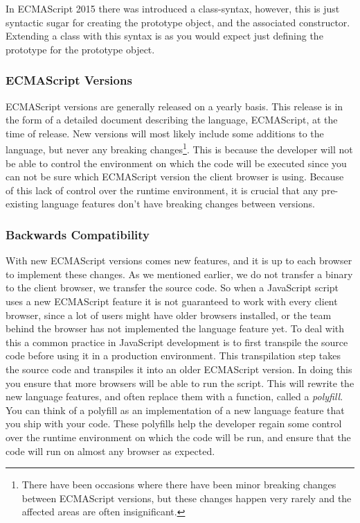 In ECMAScript 2015 there was introduced a class-syntax, however, this is just syntactic sugar for creating the prototype object, and the associated constructor.
Extending a class with this syntax is as you would expect just defining the prototype for the prototype object.

\subsubsection{ECMAScript Versions}\label{subsubsec:ecmascript-versions}

ECMAScript versions are generally released on a yearly basis.
This release is in the form of a detailed document describing the language, ECMAScript, at the time of release.
New versions will most likely include some additions to the language, but never any breaking changes\footnote{There have been occasions where there have been minor breaking changes between ECMAScript versions, but these changes happen very rarely and the affected areas are often insignificant.}.
This is because the developer will not be able to control the environment on which the code will be executed since you can not be sure which ECMAScript version the client browser is using.
Because of this lack of control over the runtime environment, it is crucial that any pre-existing language features don't have breaking changes between versions.

\subsubsection{Backwards Compatibility}\label{subsubsec:backwards-compatability}

With new ECMAScript versions comes new features, and it is up to each browser to implement these changes.
As we mentioned earlier, we do not transfer a binary to the client browser, we transfer the source code.
So when a JavaScript script uses a new ECMAScript feature it is not guaranteed to work with every client browser, since a lot of users might have older browsers installed, or the team behind the browser has not implemented the language feature yet.
To deal with this a common practice in JavaScript development is to first transpile the source code before using it in a production environment.
This transpilation step takes the source code and transpiles it into an older ECMAScript version.
In doing this you ensure that more browsers will be able to run the script.
This will rewrite the new language features, and often replace them with a function, called a \textit{polyfill}.
You can think of a polyfill as an implementation of a new language feature that you ship with your code.
These polyfills help the developer regain some control over the runtime environment on which the code will be run, and ensure that the code will run on almost any browser as expected.

